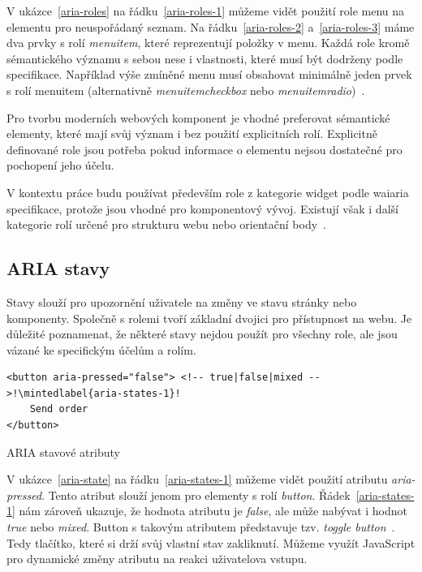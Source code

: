 V ukázce~\ref{aria-roles} na řádku~\ref{aria-roles-1} můžeme vidět použití role menu na elementu pro neuspořádaný seznam.
Na řádku~\ref{aria-roles-2} a~\ref{aria-roles-3} máme dva prvky s rolí \textit{menuitem}, které reprezentují položky v menu.
Každá role kromě sémantického významu s sebou nese i vlastnosti, které musí být dodrženy podle specifikace.
Například výše zmíněné menu musí obsahovat minimálně jeden prvek s rolí menuitem (alternativně \textit{menuitemcheckbox} nebo \textit{menuitemradio})~\cite{wai-required-owned-elements,wai-standard-guidelines-required-owned-elements}.

Pro tvorbu moderních webových komponent je vhodné preferovat sémantické elementy, které mají svůj význam i bez použití explicitních rolí.
Explicitně definované role jsou potřeba pokud informace o elementu nejsou dostatečné pro pochopení jeho účelu.

V kontextu práce budu používat především role z kategorie widget podle \gls{waiaria} specifikace, protože jsou vhodné pro komponentový vývoj.
Existují však i další kategorie rolí určené pro strukturu webu nebo orientační body~\cite{wai-catorization-of-roles}.

\subsection{ARIA stavy}

Stavy slouží pro upozornění uživatele na změny ve stavu stránky nebo komponenty.
Společně s rolemi tvoří základní dvojici pro přístupnost na webu.
Je důležité poznamenat, že některé stavy nejdou použít pro všechny role, ale jsou vázané ke specifickým účelům a rolím.

\begin{listing}[!ht]
    \begin{verbatim}
<button aria-pressed="false"> <!-- true|false|mixed -->!\mintedlabel{aria-states-1}!
    Send order
</button>
\end{verbatim}
    \caption{ARIA stavové atributy}
    \label{aria-state}
\end{listing}

V ukázce~\ref{aria-state} na řádku~\ref{aria-states-1} můžeme vidět použití atributu \textit{aria-pressed}.
Tento atribut slouží jenom pro elementy s rolí \textit{button}.
Řádek~\ref{aria-states-1} nám zároveň ukazuje, že hodnota atributu je \textit{false}, ale může nabývat i hodnot \textit{true} nebo \textit{mixed}.
Button s takovým atributem představuje tzv. \textit{toggle button}~\cite{mdn-aria-pressed}. Tedy tlačítko, které si drží svůj vlastní stav zakliknutí.
Můžeme využít JavaScript pro dynamické změny atributu na reakci uživatelova vstupu.

